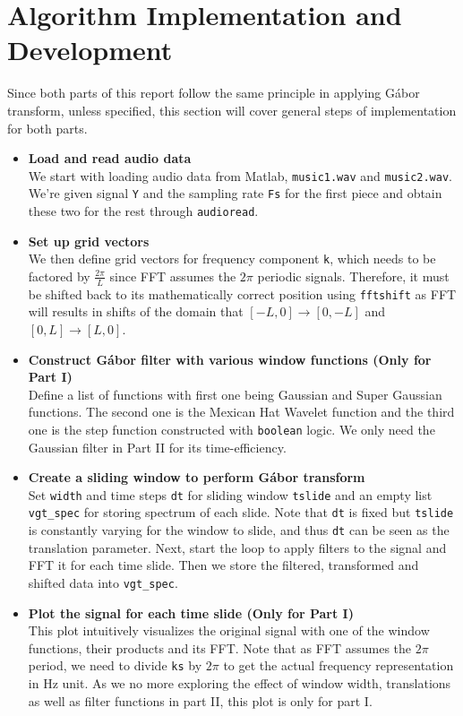 \documentclass[10pt,a4paper]{article}
\numberwithin{equation}{subsection}
\begin{document}
\section{Algorithm Implementation and Development}
Since both parts of this report follow the same principle in applying G\'abor transform, unless specified, this section will cover general steps of implementation for both parts.
\begin{itemize}

\item \textbf{Load and read audio data}\\
We start with loading audio data from Matlab, \texttt{music1.wav} and \texttt{music2.wav}. We're given signal \texttt{Y} and the sampling rate \texttt{Fs} for the first piece and obtain these two for the rest through \texttt{audioread}.

\item \textbf{Set up grid vectors}\\
We then define grid vectors for frequency component \texttt{k}, which needs to be factored by $\frac{2\pi}{L}$ since FFT assumes the $2\pi$ periodic signals. Therefore, it must be shifted back to its mathematically
correct position using \texttt{fftshift} as FFT will results in shifts
of the domain that $[-L, 0] \rightarrow [0, -L]$ and $[0, L] \rightarrow [L, 0]$. \cite{582}

\item \textbf{Construct G\'abor filter with various window functions (Only for Part I)}\\
Define a list of functions with first one being Gaussian and Super Gaussian functions. The second one is the Mexican Hat Wavelet function and the third one is the step function constructed with \texttt{boolean} logic. We only need the Gaussian filter in Part II for its time-efficiency.

\item \textbf{Create a sliding window to perform G\'abor transform}\\
Set \texttt{width} and time steps \texttt{dt} for sliding window \texttt{tslide} and an empty list \texttt{vgt\_spec} for storing spectrum of each slide. Note that \texttt{dt} is fixed but \texttt{tslide} is constantly varying for the window to slide, and thus \texttt{dt} can be seen as the translation parameter. Next, start the loop to apply filters to the signal and FFT it for each time slide. Then we store the filtered, transformed and shifted data into \texttt{vgt\_spec}.

\item \textbf{Plot the signal for each time slide (Only for Part I)}\\
This plot intuitively visualizes the original signal with one of the window functions, their products and its FFT. Note that as FFT assumes the $2\pi$ period, we need to divide \texttt{ks} by $2\pi$ to get the actual frequency representation in Hz unit. As we no more exploring the effect of window width, translations as well as filter functions in part II, this plot is only for part I.


\end{itemize}
\end{document}
